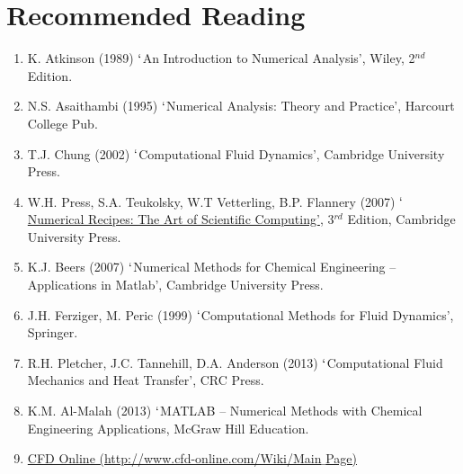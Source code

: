 \documentclass[11pt,oneside,a4paper]{article}
\begin{document}
\section{Recommended Reading}
\begin{enumerate}
%
\item K. Atkinson (1989) $\lq$An Introduction to Numerical Analysis', Wiley, 2$^{nd}$ Edition.
%
\item N.S. Asaithambi (1995) $\lq$Numerical Analysis: Theory and Practice', Harcourt College Pub.
%
\item T.J. Chung (2002) $\lq$Computational Fluid Dynamics', Cambridge University Press.
%
\item W.H. Press, S.A. Teukolsky, W.T Vetterling, B.P. Flannery (2007) \href{http://www.nr.com/oldverswitcher.html}{$\lq$Numerical Recipes: The Art of Scientific Computing'}, 3$^{rd}$ Edition, Cambridge University Press.
%
\item K.J. Beers (2007) $\lq$Numerical Methods for Chemical Engineering -- Applications in Matlab', Cambridge University Press.
%
\item J.H. Ferziger, M. Peric (1999) $\lq$Computational Methods for Fluid Dynamics', Springer.
%
\item R.H. Pletcher, J.C. Tannehill, D.A. Anderson (2013) $\lq$Computational Fluid Mechanics and Heat Transfer', CRC Press.
%
\item K.M. Al-Malah (2013) $\lq$MATLAB -- Numerical Methods with Chemical Engineering Applications, McGraw Hill Education.
%
\item \href{http://www.cfd-online.com/Wiki/Main_Page}{CFD Online (http://www.cfd-online.com/Wiki/Main$\_$Page)}
%
\end{enumerate}
\end{document}

